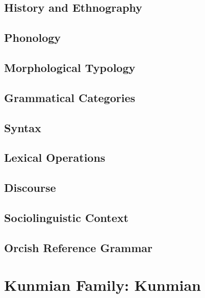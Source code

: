\documentclass[12pt,letterpaper,openany,twoside]{memoir}
\let\originalpart=\part
\def\part{\cleardoublepage\originalpart}
\begin{document}
\chapter{History and Ethnography}

\chapter{Phonology}

\chapter{Morphological Typology}

\chapter{Grammatical Categories}

\chapter{Syntax}

\chapter{Lexical Operations}

\chapter{Discourse}

\chapter{Sociolinguistic Context}

\chapter{Orcish Reference Grammar}

\part{Kunmian Family: Kunmian}
\end{document}
